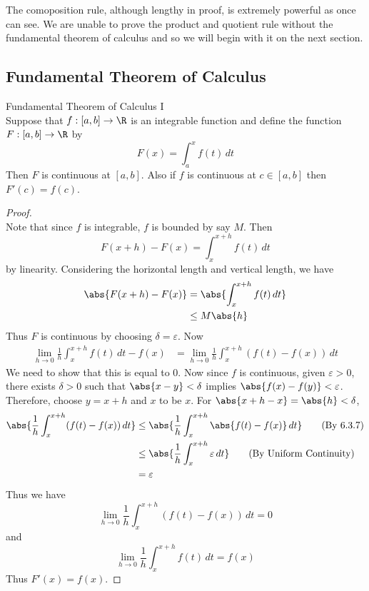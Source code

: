 \documentclass[a4paper]{article}
\begin{document}
The comoposition rule, although lengthy in proof, is extremely powerful as once can see. We are unable to prove the product and quotient rule without the fundamental theorem of calculus and so we will begin with it on the next section. 

\subsection{Fundamental Theorem of Calculus}
\begin{thm}{Fundamental Theorem of Calculus I}{}\\ Suppose that $f:[a,b]\to\R$ is an integrable function and define the function $F:[a,b]\to\R$ by $$F(x)=\int_{a}^{x}f(t)\,dt$$ Then $F$ is continuous at $[a,b]$. Also if $f$ is continuous at $c\in[a,b]$ then $F'(c)=f(c)$. 
\begin{proof}\\
Note that since $f$ is integrable, $f$ is bounded by say $M$. Then $$F(x+h)-F(x)=\int_x^{x+h}f(t)\,dt$$ by linearity. Considering the horizontal length and vertical length, we have
\begin{align*}
\abs{F(x+h)-F(x)}&=\abs{\int_x^{x+h}f(t)\,dt}\\
&\leq M\abs{h}
\end{align*}
Thus $F$ is continuous by choosing $\delta=\varepsilon$. 
Now 
\begin{align*}
\lim_{h\to 0}\frac{1}{h}\int_x^{x+h}f(t)\,dt-f(x)&=\lim_{h\to 0}\frac{1}{h}\int_x^{x+h}(f(t)-f(x))\,dt
\end{align*}
We need to show that this is equal to $0$. Now since $f$ is continuous, given $\varepsilon>0$, there exists $\delta>0$ such that $\abs{x-y}<\delta$ implies $\abs{f(x)-f(y)}<\varepsilon$. Therefore, choose $y=x+h$ and $x$ to be $x$. For $\abs{x+h-x}=\abs{h}<\delta$, 
\begin{align*}
\abs{\frac{1}{h}\int_x^{x+h}(f(t)-f(x))\,dt}&\leq\abs{\frac{1}{h}\int_x^{x+h}\abs{f(t)-f(x)}\,dt}\tag{By 6.3.7}\\
&\leq\abs{\frac{1}{h}\int_x^{x+h}\varepsilon\,dt}\tag{By Uniform Continuity}\\
&=\varepsilon
\end{align*}
Thus we have $$\lim_{h\to 0}\frac{1}{h}\int_x^{x+h}(f(t)-f(x))\,dt=0$$ and $$\lim_{h\to 0}\frac{1}{h}\int_x^{x+h}f(t)\,dt=f(x)$$
Thus $F'(x)=f(x)$. 
\end{proof}
\end{thm}
\end{document}
